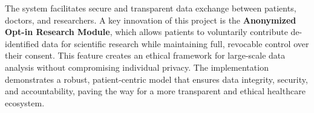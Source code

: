 \documentclass[12pt, a4paper]{report}
\begin{document}
The system facilitates secure and transparent data exchange between patients, doctors, and researchers. A key innovation of this project is the \textbf{Anonymized Opt-in Research Module}, which allows patients to voluntarily contribute de-identified data for scientific research while maintaining full, revocable control over their consent. This feature creates an ethical framework for large-scale data analysis without compromising individual privacy. The implementation demonstrates a robust, patient-centric model that ensures data integrity, security, and accountability, paving the way for a more transparent and ethical healthcare ecosystem.
\newpage

\tableofcontents
\newpage








\end{document}
